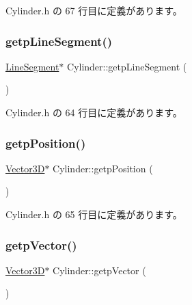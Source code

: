 Cylinder.\+h の 67 行目に定義があります。

\mbox{\label{class_cylinder_acc2a2c2a32575bb93ebfa9a21bb43fb8}} 
\subsubsection{\texorpdfstring{getp\+Line\+Segment()}{getpLineSegment()}}
{\footnotesize\ttfamily \mbox{\hyperlink{class_line_segment}{Line\+Segment}}$\ast$ Cylinder\+::getp\+Line\+Segment (\begin{DoxyParamCaption}{ }\end{DoxyParamCaption})\hspace{0.3cm}{\ttfamily [inline]}}



 Cylinder.\+h の 64 行目に定義があります。

\mbox{\label{class_cylinder_a18c61448fbb080c79ab6b1a431803dea}} 
\subsubsection{\texorpdfstring{getp\+Position()}{getpPosition()}}
{\footnotesize\ttfamily \mbox{\hyperlink{class_vector3_d}{Vector3D}}$\ast$ Cylinder\+::getp\+Position (\begin{DoxyParamCaption}{ }\end{DoxyParamCaption})\hspace{0.3cm}{\ttfamily [inline]}}



 Cylinder.\+h の 65 行目に定義があります。

\mbox{\label{class_cylinder_a7b1cd37bc88e50d81b4de4a34e0dafb0}} 
\subsubsection{\texorpdfstring{getp\+Vector()}{getpVector()}}
{\footnotesize\ttfamily \mbox{\hyperlink{class_vector3_d}{Vector3D}}$\ast$ Cylinder\+::getp\+Vector (\begin{DoxyParamCaption}{ }\end{DoxyParamCaption})\hspace{0.3cm}{\ttfamily [inline]}}



